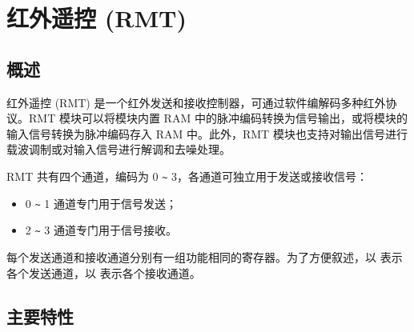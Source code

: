 \documentclass[main\_\_CN.tex]{subfiles}
\begin{document}

\ifglobal
\else
    \listoftodos
    {\let\clearpage\relax \listofdonetodos}
    \tableofcontents
\fi



\hypertarget{rmt}{}
\chapter{红外遥控 (RMT)}
\label{mod:rmt}

\section{概述}

红外遥控 (RMT) 是一个红外发送和接收控制器，可通过软件编解码多种红外协议。RMT 模块可以将模块内置 RAM 中的脉冲编码转换为信号输出，或将模块的输入信号转换为脉冲编码存入 RAM 中。此外，RMT 模块也支持对输出信号进行载波调制或对输入信号进行解调和去噪处理。

RMT 共有四个通道，编码为 0 \verb+~+ 3，各通道可独立用于发送或接收信号：
\begin{itemize}
\item 0 \verb+~+ 1 通道专门用于信号发送；
\item 2 \verb+~+ 3 通道专门用于信号接收。
\end{itemize}

每个发送通道和接收通道分别有一组功能相同的寄存器。为了方便叙述，以  表示各个发送通道，以  表示各个接收通道。

\section{主要特性}
\end{document}
